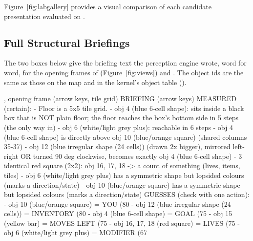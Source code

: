 Figure~\ref{fig:labgallery} provides a visual comparison of each candidate presentation evaluated on .

\subsection{Full Structural Briefings}
\label{app:briefings}

The two boxes below give the briefing text the perception engine wrote, word for word, for the opening frames of  (Figure~\ref{fig:views}) and . The object ids are the same as those on the map and in the kernel's object table ().

\begin{briefing}{, opening frame (arrow keys, tile grid)}
BRIEFING (arrow keys)
MEASURED (certain):
- Floor is a 5x5 tile grid.
- obj 4 (blue 6-cell shape): sits inside a black box that is NOT plain floor; the floor reaches the box's bottom side in 5 steps (the only way in)
- obj 6 (white/light grey plus): reachable in 6 steps
- obj 4 (blue 6-cell shape) is directly above obj 10 (blue/orange square) (shared columns 35-37)
- obj 12 (blue irregular shape (24 cells)) (drawn 2x bigger), mirrored left-right OR turned 90 deg clockwise, becomes exactly obj 4 (blue 6-cell shape)
- 3 identical red square (2x2): obj 16, 17, 18 -> a count of something (lives, items, tiles)
- obj 6 (white/light grey plus) has a symmetric shape but lopsided colours (marks a direction/state)
- obj 10 (blue/orange square) has a symmetric shape but lopsided colours (marks a direction/state)
GUESSES (check with one action):
- obj 10 (blue/orange square) = YOU (80%
- obj 12 (blue irregular shape (24 cells)) = INVENTORY (80%
- obj 4 (blue 6-cell shape) = GOAL (75%
- obj 15 (yellow bar) = MOVES LEFT (75%
- obj 16, 17, 18 (red square) = LIVES (75%
- obj 6 (white/light grey plus) = MODIFIER (67%
\end{briefing}

